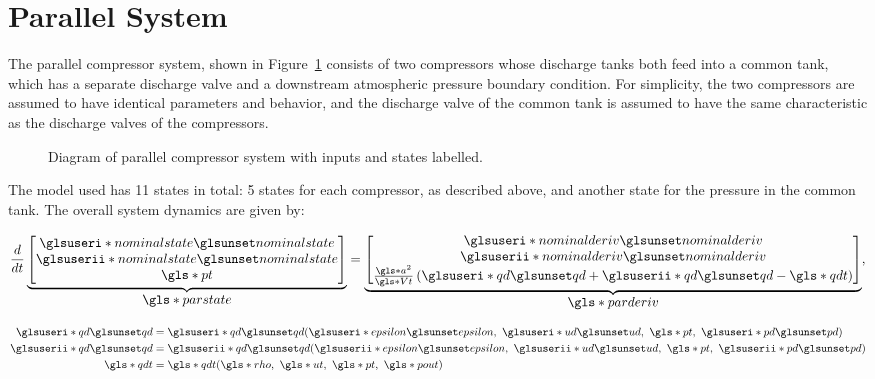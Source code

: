 \section{Parallel System}
\label{sec:mod:parallel}

The parallel compressor system, shown in Figure~\ref{fig:mod:parallel} consists of two compressors whose discharge tanks both feed into a common tank, which has a separate discharge valve and a downstream atmospheric pressure boundary condition.
For simplicity, the two compressors are assumed to have identical parameters and behavior, and the discharge valve of the common tank is assumed to have the same characteristic as the discharge valves of the compressors.

\begin{figure}
  \centering
  
  \caption[Diagram of parallel compressor system.]{Diagram of parallel compressor system with inputs and states labelled.}
  \label{fig:mod:parallel}
\end{figure}



The model used has 11 states in total: 5 states for each compressor, as described above, and another state for the pressure in the common tank. The overall system dynamics are given by:

\begin{equation}
  \dt{}
  \ubrace{\begin{bmatrix}
    \gi{nominalstate}\\
    \gii{nominalstate}\\
    \g{pt} 
  \end{bmatrix}}{\g{parstate}}
  =
  \ubrace{\begin{bmatrix}
    \gi{nominalderiv}\\
    \gii{nominalderiv}\\
    \frac{\g{a}^2}{\g{Vt}}\left(\gi{qd}+\gii{qd}-\g{qdt}\right)
  \end{bmatrix}}{\g{parderiv}},
\end{equation}

\begin{equation}
  \begin{split}
    \gi{qd} & = \gi{qd}(\gi{epsilon},\ \gi{ud},\ \g{pt},\ \gi{pd})\\
    \gii{qd} & = \gii{qd}(\gii{epsilon},\ \gii{ud},\ \g{pt},\ \gii{pd})\\
    \g{qdt} & = \g{qdt}(\g{rho},\ \g{ut},\ \g{pt},\ \g{pout})
  \end{split}
\end{equation}

